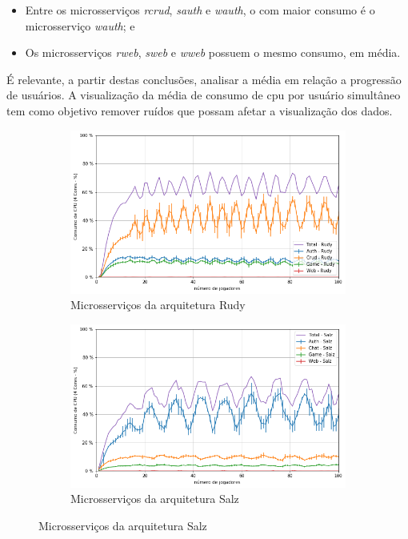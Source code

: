 \begin{itemize}
 \item Entre os microsserviços \textit{rcrud}, \textit{sauth} e \textit{wauth}, o com maior consumo é o microsserviço \textit{wauth}; e
 \item Os microsserviços \textit{rweb}, \textit{sweb} e \textit{wweb} possuem o mesmo consumo, em média.
\end{itemize}

É relevante, a partir destas conclusões, analisar a média em relação a progressão de usuários.
%
A visualização da média de consumo de \ac{cpu} por usuário simultâneo tem como objetivo remover ruídos que possam afetar a visualização dos dados.

\begin{figure}[htb!]
    \caption{Média do consumo de \ac{cpu} dos microsserviços por jogador simultâneo}
    \label{fig:cpu_game_media_por_jogador}

    \begin{subfigure}{0.5\textwidth}
        \centering
        \includegraphics[width=.95\linewidth]{figuras/analise/cpu_r_arch_media_por_jogador.png}
        \caption{Microsserviços da arquitetura Rudy}
        \label{fig:cpu_r_arch_media_por_jogador}
    \end{subfigure}%
    \begin{subfigure}{0.5\textwidth}
        \centering
        \includegraphics[width=.95\linewidth]{figuras/analise/cpu_s_arch_media_por_jogador.png}
        \caption{Microsserviços da arquitetura Salz}
        \label{fig:cpu_s_arch_media_por_jogador}
    \end{subfigure}


\end{figure}
